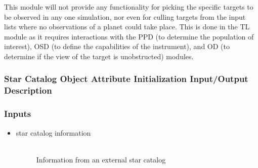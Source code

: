 \documentclass[cleanfoot]{asme2ej}
\begin{document}
This module will not provide any functionality for picking the specific targets to be observed in any one simulation, nor even for culling targets from the input lists where no observations of a planet could take place.  This is done in the TL module as it requires interactions with the PPD (to determine the population of interest), OSD (to define the capabilities of the instrument), and OD (to determine if the view of the target is unobstructed) modules.
\label{sec:starcatalog}
\subsubsection{Star Catalog Object Attribute Initialization Input/Output Description} 
\subsubsection*{Inputs}
\begin{itemize}
    \item 
    \begin{description}
        \item[star catalog information] \hfill \\
    Information from an external star catalog 
    \end{description}
\end{itemize}
\end{document}
